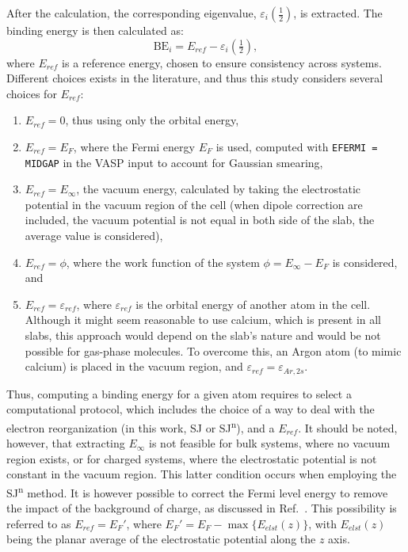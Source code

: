 \documentclass[journal=jpccck,manuscript=article]{achemso}
\begin{document}
After the calculation, the corresponding eigenvalue, $\varepsilon_i\left(\frac{1}{2}\right)$, is extracted. The binding energy is then calculated as:
\begin{equation}
	\text{BE}_i = 
	E_{ref}- \varepsilon_i\left(\tfrac{1}{2}\right), \label{eq:xpsbe}
\end{equation}
where $E_{ref}$ is a reference energy, chosen to ensure consistency across systems. Different choices exists in the literature, and thus this study considers several choices for $E_{ref}$:
\begin{enumerate}
	\item $E_{ref}=0$, thus using only the orbital energy,
	\item $E_{ref}=E_F$, where the Fermi energy $E_F$ is used, computed with \texttt{EFERMI = MIDGAP} in the VASP input to account for Gaussian smearing,
	\item $E_{ref}=E_\infty$, the vacuum energy, calculated by taking the electrostatic potential in the vacuum region of the cell (when dipole correction are included, the vacuum potential is not equal in both side of the slab, the average value is considered),
	\item $E_{ref}=\phi$, where the work function of the system $\phi = E_\infty - E_F$ is considered\cite{kahnFermiLevelWork2015}, and
	\item $E_{ref}= \varepsilon_{ref}$, where $\varepsilon_{ref}$ is the orbital energy of another atom in the cell. Although it might seem reasonable to use calcium, which is present in all slabs, this approach would depend on the slab's nature and would be not possible for gas-phase molecules. To overcome this, an Argon atom (to mimic calcium) is placed in the vacuum region, and $\varepsilon_{ref}=\varepsilon_{Ar,2s}$.
\end{enumerate}
Thus, computing a binding energy for a given atom requires to select a computational protocol, which includes the choice of a  way to deal with the electron reorganization  (in this work, SJ or SJ\textsuperscript{n}), and a $E_{ref}$.
It should be noted, however, that extracting $E_\infty$ is not feasible for bulk systems, where no vacuum region exists, or for charged systems, where the electrostatic potential is not constant in the vacuum region. This latter condition occurs when employing the SJ\textsuperscript{n} method. It is however possible to correct the Fermi level energy to remove the impact of the background of charge, as discussed in Ref.~. This possibility is referred to as $E_{ref}=E_F'$, where $E_F' = E_F - \max\{E_{elst}(z)\}$, with $E_{elst}(z)$ being the planar average of the electrostatic potential along the $z$ axis.
\end{document}
